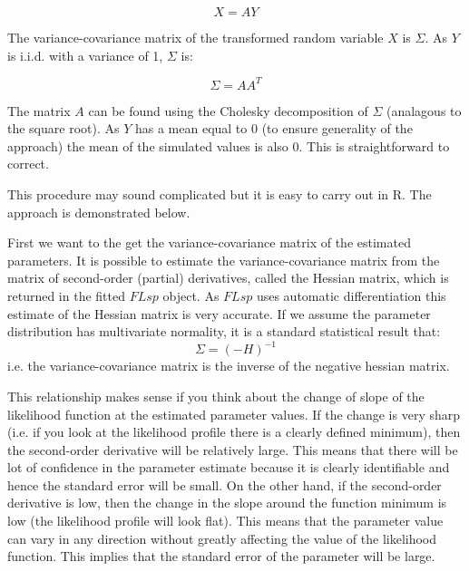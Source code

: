 \documentclass[a4paper]{article}
\begin{document}
\begin{equation}
X = A Y
\end{equation}

The variance-covariance matrix of the transformed random variable $X$ is $\Sigma$.
As $Y$ is i.i.d. with a variance of 1, $\Sigma$ is:

\begin{equation}
\Sigma = A A^T
\end{equation}

The matrix $A$ can be found using the Cholesky decomposition of $\Sigma$ (analagous to the square root). As $Y$ has a mean equal to 0 (to ensure generality of the approach) the mean of the simulated values is also 0. This is straightforward to correct.

This procedure may sound complicated but it is easy to carry out in R.
The approach is demonstrated below.

First we want to the get the variance-covariance matrix of the estimated parameters.
It is possible to estimate the variance-covariance matrix from the matrix of second-order (partial) derivatives, called the Hessian matrix,
which is returned in the fitted $FLsp$ object. As $FLsp$ uses automatic differentiation this estimate of the Hessian matrix is very accurate.
If we assume the parameter distribution has multivariate normality, it is a standard statistical result that:
\begin{equation}
\Sigma = (-H)^{-1}
\end{equation}
i.e. the variance-covariance matrix is the inverse of the negative hessian matrix.

This relationship makes sense if you think about the change of slope of the likelihood function at the estimated parameter values.
If the change is very sharp (i.e. if you look at the likelihood profile there is a clearly defined minimum),
then the second-order derivative will be relatively large. This means that there will be lot of confidence in the parameter estimate because
it is clearly identifiable and hence the standard error will be small.
On the other hand, if the second-order derivative is low, then the change in the slope around the function minimum is low (the likelihood profile will look flat).
This means that the parameter value can vary in any direction without greatly affecting the value of the likelihood function.
This implies that the standard error of the parameter will be large.
\end{document}
